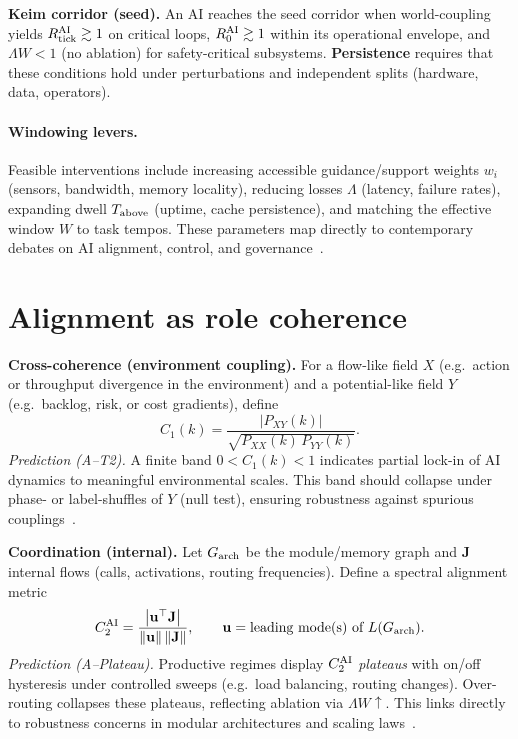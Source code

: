 \documentclass[12pt,a4paper,oneside]{scrreprt}
\begin{document}
\textbf{Keim corridor (seed).} 
An AI reaches the seed corridor when world-coupling yields $R_{\rm tick}^{\rm AI}\gtrsim 1$ on critical loops, $R_0^{\rm AI}\gtrsim 1$ within its operational envelope, and $\Lambda W<1$ (no ablation) for safety-critical subsystems. 
\textbf{Persistence} requires that these conditions hold under perturbations and independent splits (hardware, data, operators).

\paragraph{Windowing levers.}
Feasible interventions include increasing accessible guidance/support weights $w_i$ (sensors, bandwidth, memory locality), reducing losses $\Lambda$ (latency, failure rates), expanding dwell $T_{\rm above}$ (uptime, cache persistence), and matching the effective window $W$ to task tempos. 
These parameters map directly to contemporary debates on AI alignment, control, and governance~\cite{carlsmith2022alignment,openai2023governance,hendrycks2023overview}.


\section{Alignment as role coherence}\label{sec:ai-alignment}
\textbf{Cross-coherence (environment coupling).}  
For a flow-like field $X$ (e.g.\ action or throughput divergence in the environment) and a potential-like field $Y$ (e.g.\ backlog, risk, or cost gradients), define
\[
C_1(k)=\frac{|P_{XY}(k)|}{\sqrt{P_{XX}(k)\,P_{YY}(k)}}.
\]
\emph{Prediction (A–T2).} A finite band $0<C_1(k)<1$ indicates partial lock-in of AI dynamics to meaningful environmental scales. 
This band should collapse under phase- or label-shuffles of $Y$ (null test), ensuring robustness against spurious couplings~\cite{carlsmith2022alignment,leike2018scalable}.

\textbf{Coordination (internal).}  
Let $G_{\rm arch}$ be the module/memory graph and $\mathbf J$ internal flows (calls, activations, routing frequencies). 
Define a spectral alignment metric
\[
C_2^{\rm AI}=\frac{\big|\mathbf u^\top \mathbf J\big|}{\|\mathbf u\|\,\|\mathbf J\|},\qquad 
\mathbf u=\text{leading mode(s) of }L(G_{\rm arch}).
\]
\emph{Prediction (A–Plateau).} Productive regimes display $C_2^{\rm AI}$ \emph{plateaus} with on/off hysteresis under controlled sweeps (e.g.\ load balancing, routing changes). 
Over-routing collapses these plateaus, reflecting ablation via $\Lambda W \uparrow$. 
This links directly to robustness concerns in modular architectures and scaling laws~\cite{ganguli2022predictability,hendrycks2023overview}. 
\end{document}
